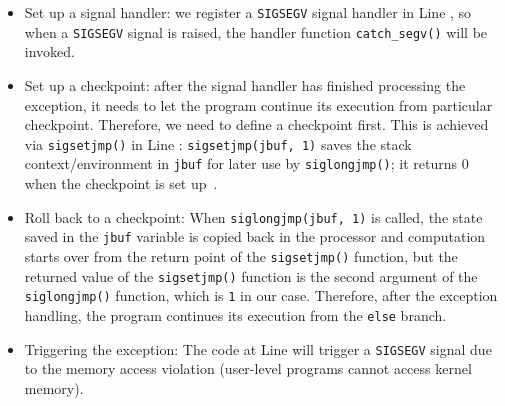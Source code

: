 \begin{itemize}

\item Set up a signal handler: we register a \texttt{SIGSEGV} signal handler in Line , so when
a \texttt{SIGSEGV} signal is raised, the handler function \texttt{catch\_segv()} will be invoked. 

\item Set up a checkpoint: after the signal handler has finished processing the exception, it
needs to let the program continue its execution from particular checkpoint. 
Therefore, we need to define a checkpoint first. This is achieved via
\texttt{sigsetjmp()} in Line : 
\texttt{sigsetjmp(jbuf, 1)} saves the stack context/environment in \texttt{jbuf} 
for later use by \texttt{siglongjmp()};  it returns 0 when the 
checkpoint is set up~\cite{sigsetjmp}. 


\item Roll back to a checkpoint: When \texttt{siglongjmp(jbuf, 1)} is called, the
state saved in the \texttt{jbuf} variable is copied back in the processor and computation starts over
from the return point of the \texttt{sigsetjmp()} function, 
but the returned value of the \texttt{sigsetjmp()} function  
is the second argument of the \texttt{siglongjmp()} function, which is \texttt{1} in our case.
Therefore, after the exception handling, the program continues its execution from the
\texttt{else} branch.  

\item Triggering the exception: The code at Line  will 
trigger a \texttt{SIGSEGV} signal due to the memory access violation (user-level programs
cannot access kernel memory).

\end{itemize}



%

